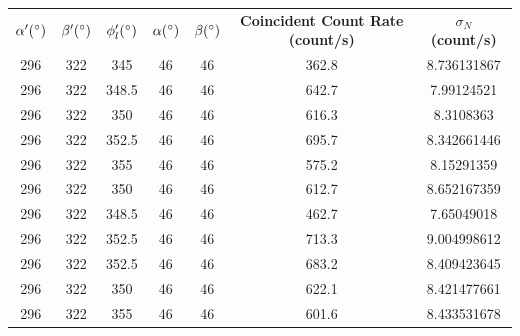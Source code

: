 \documentclass{article}
\begin{document}
\begin{table}[H]
{\begin{tabular}{ccccccc}
    \textbf{$\alpha'(\degree)$} & \textbf{$\beta'(\degree)$} & \textbf{$\phi_l'(\degree)$} & \textbf{$\alpha(\degree)$} & \textbf{$\beta(\degree)$} & \textbf{Coincident Count Rate (count/s)} & \textbf{$\sigma_N$ (count/s)} \\
    296 & 322 & 345 & 46 & 46 & 362.8 & 8.736131867 \\
    296 & 322 & 348.5 & 46 & 46 & 642.7 & 7.99124521 \\
    296 & 322 & 350 & 46 & 46 & 616.3 & 8.3108363 \\
    296 & 322 & 352.5 & 46 & 46 & 695.7 & 8.342661446 \\
    296 & 322 & 355 & 46 & 46 & 575.2 & 8.15291359 \\
    296 & 322 & 350 & 46 & 46 & 612.7 & 8.652167359 \\
    296 & 322 & 348.5 & 46 & 46 & 462.7 & 7.65049018 \\
    296 & 322 & 352.5 & 46 & 46 & 713.3 & 9.004998612 \\
    296 & 322 & 352.5 & 46 & 46 & 683.2 & 8.409423645 \\
    296 & 322 & 350 & 46 & 46 & 622.1 & 8.421477661 \\
    296 & 322 & 355 & 46 & 46 & 601.6 & 8.433531678
    \end{tabular}}
    \end{table}
\begin{table}[H]
    \centering
    \caption{Bell Constants Measurements of Coincidence Count Rates}
    \label{my-label}
    \end{table}
\end{document}
